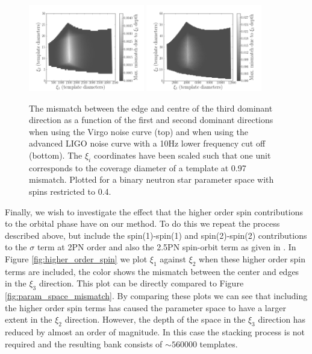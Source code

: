 \begin{figure}
\includegraphics[width=0.45\textwidth]{papers/bns_spin/figure7a.png}
\includegraphics[width=0.45\textwidth]{papers/bns_spin/figure7b.png}
\caption{\label{fig:param_space_mismatch_alt} The mismatch between the edge and centre of the
third dominant direction as a function of the first and second dominant
directions when using the Virgo noise curve (top) and when using the advanced LIGO noise curve
with a 10Hz lower frequency cut off (bottom). The $\xi_i$ coordinates have been scaled
such that one unit corresponds to the coverage diameter of a template
at 0.97 mismatch.
Plotted for a binary neutron star parameter space with spins restricted
to 0.4.}
\end{figure}

Finally, we wish to investigate the effect that the higher order spin contributions to the orbital phase
have on our method. To do this we repeat the process described above, but include the spin(1)-spin(1) and
spin(2)-spin(2) contributions to the $\sigma$ term at 2PN order and also the 2.5PN spin-orbit term as given
in \cite{Arun:2008kb}. In Figure \ref{fig:higher_order_spin} we plot $\xi_1$ against $\xi_2$ when these
higher order spin terms are included, the color shows the mismatch between the center and edges
in the $\xi_3$ direction. This plot can be directly compared to Figure \ref{fig:param_space_mismatch}.
By comparing these plots we can see that including the higher order spin terms has caused the parameter space
to have a larger extent in the $\xi_2$ direction. However, the depth of the space in the $\xi_3$ direction
has reduced by almost an order of magnitude. In this case the stacking process is not required and the resulting
bank consists of $\sim560000$ templates. 


